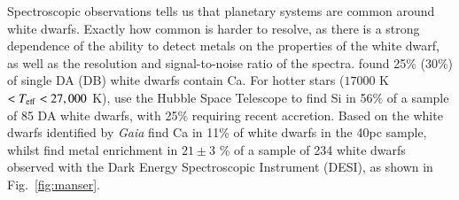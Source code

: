 \documentclass[onecolumn,authoryear]{els-mrw}
\begin{document}
Spectroscopic observations tells us that planetary systems are common around white dwarfs. Exactly how common is harder to resolve, as there is a strong dependence of the ability to detect metals on the properties of the white dwarf, as well as the resolution and signal-to-noise ratio of the spectra. \cite{Zuckerman03, Zuckerman2010} found 25\% (30\%) of single DA (DB) white dwarfs contain Ca. For hotter stars  ($17 000$ K$ <T_{\rm eff} < 27, 000$ K), \cite{Koester2014} use the Hubble Space Telescope to find Si in 56\% of a sample of 85 DA white dwarfs, with 25\% requiring recent accretion. Based on the white dwarfs identified by {\it Gaia} \cite{Obrien2024} find Ca in 11\% of white dwarfs in the 40pc sample, whilst \cite{Manser2024b} find metal enrichment in  $21\pm 3$ \% of a sample of 234 white dwarfs observed with the Dark Energy Spectroscopic Instrument (DESI), as shown in Fig.~\ref{fig:manser}. 
\end{document}
